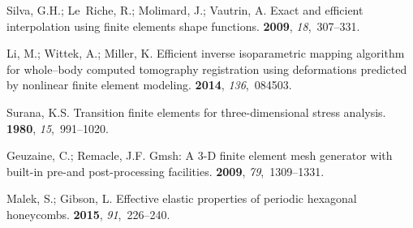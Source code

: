 \documentclass[sensors,article,accept,moreauthors,pdftex]{Definitions/mdpi}
\begin{document}
\begin{thebibliography}{999}
Silva, G.H.; Le~Riche, R.; Molimard, J.; Vautrin, A.
\newblock Exact and efficient interpolation using finite elements shape
  functions.
 {\bf 2009}, {\em 18},~307--331.

Li, M.; Wittek, A.; Miller, K.
\newblock Efficient inverse isoparametric mapping algorithm for whole--body
  computed tomography registration using deformations predicted by nonlinear
  finite element modeling.
 {\bf 2014}, {\em 136},~084503.

Surana, K.S.
\newblock Transition finite elements for three-dimensional stress analysis.
 {\bf 1980}, {\em 15},~991--1020.

Geuzaine, C.; Remacle, J.F.
\newblock Gmsh: A 3-D finite element mesh generator with built-in pre-and
  post-processing facilities.
 {\bf 2009}, {\em 79},~1309--1331.

Malek, S.; Gibson, L.
\newblock Effective elastic properties of periodic hexagonal honeycombs.
 {\bf 2015}, {\em 91},~226--240.

\end{thebibliography}
\end{document}
